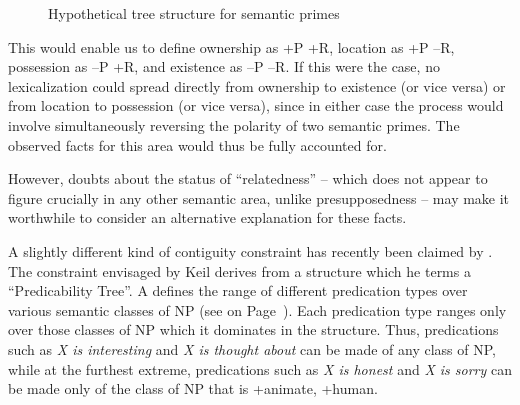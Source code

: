
\begin{figure}
	\begin{center}
		
		
		\caption{Hypothetical tree structure for semantic primes}\label{fig:4.6}
	\end{center}
\end{figure}

This would enable us to define ownership as +P +R, location as +P --R, possession as --P +R, and existence as --P --R. If this were the case, no lexicalization could spread directly from ownership to existence (or vice versa) or from location to possession (or vice versa), since in either case the process would involve simultaneously reversing the polarity of two semantic primes. The observed facts for this area would thus be fully accounted for.

However, doubts about the status of ``relatedness'' -- which does not appear to figure crucially in any other semantic area, unlike presupposedness -- may make it worthwhile to consider an alternative explanation for these facts.

A slightly different kind of contiguity constraint has recently been claimed by \citet{Keil1979,Keil1981}. The constraint envisaged by Keil derives from a structure which he terms a ``Predicability Tree''. A  defines the range of different predication types over various semantic classes of NP (see  on Page~\pageref{fig:4.7}). Each predication type ranges only over those classes of NP which it dominates in the structure. Thus, predications such as \textit{X is interesting} and \textit{X is thought about} can be made of any class of NP, while at the
furthest extreme, predications such as \textit{X is honest} and \textit{X is sorry} can be made only of the class of NP that is +animate, +human.

